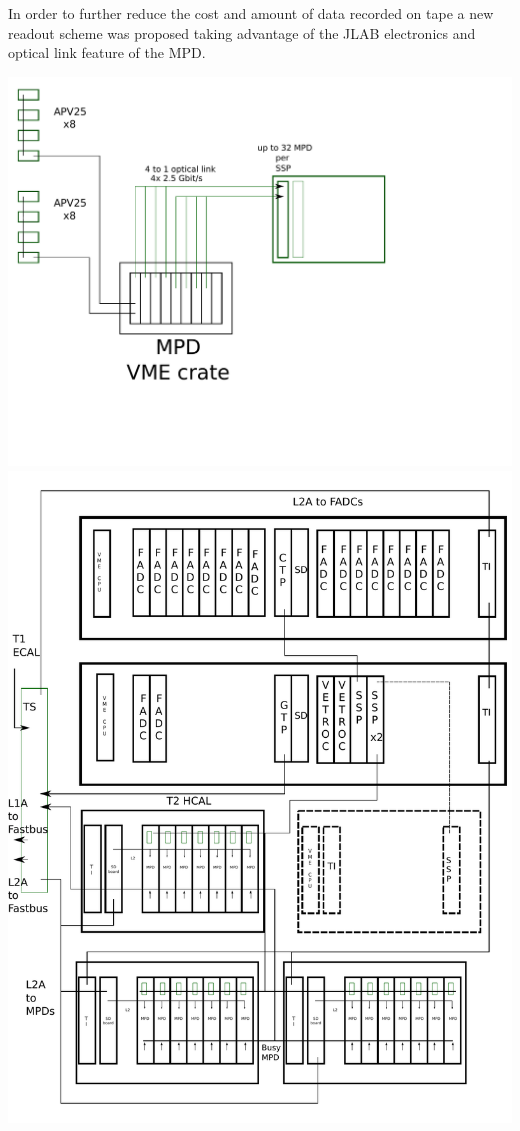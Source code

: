 \documentclass{article}
\begin{document}
In order to further reduce the cost and amount of data recorded on tape a new readout scheme was proposed taking advantage of the JLAB electronics and optical link feature of the MPD.

\includegraphics[scale=0.55]{figs/NewMPD.pdf}\\

\includegraphics[scale=0.55]{figs/NewMPDDetailed.pdf}\\
\end{document}
